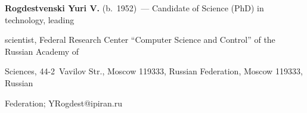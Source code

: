   

  \vspace*{3pt}

  

  \noindent

  \textbf{Rogdestvenski Yuri V.} (b.\ 1952)~--- Candidate of Science (PhD) in technology, leading 

scientist, Federal Research Center ``Computer Science and Control'' of the Russian Academy of 

Sciences, 44-2~Vavilov Str., Moscow 119333, Russian Federation, Moscow 119333, Russian 

Federation; \mbox{YRogdest@ipiran.ru}

\label{end\stat}



\renewcommand{\bibname}{\protect\rm Литература} 

  

  

